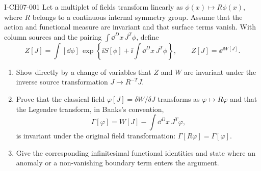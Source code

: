 \begin{exercise}{I-CH07-001}
Let a multiplet of fields transform linearly as
$\phi(x)\mapsto R\phi(x)$, where $R$ belongs to a continuous internal
symmetry group.  Assume that the action and functional measure are invariant
and that surface terms vanish.  With column sources and the pairing
$\int\dd^D x\,J^T\phi$, define
\[
 Z[J]=\int[\dd\phi]\,
 \exp\left\{\ii S[\phi]+\ii\int\dd^D x\,J^T\phi\right\},
 \qquad Z[J]=\ee^{\ii W[J]}.
\]
\begin{enumerate}[label=(\alph*)]
\item Show directly by a change of variables that $Z$ and $W$ are invariant
under the inverse source transformation $J\mapsto R^{-T}J$.

\item Prove that the classical field
$\varphi[J]=\delta W/\delta J$ transforms as $\varphi\mapsto R\varphi$ and
that the Legendre transform, in Banks's convention,
\[
 \Gamma[\varphi]=W[J]-\int\dd^D x\,J^T\varphi,
\]
is invariant under the original field transformation:
$\Gamma[R\varphi]=\Gamma[\varphi]$.

\item Give the corresponding infinitesimal functional identities and state
where an anomaly or a non-vanishing boundary term enters the argument.
\end{enumerate}
\end{exercise}
